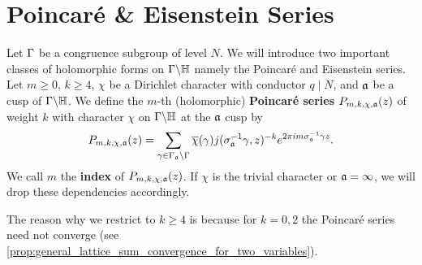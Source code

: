   \section{Poincar\'e \& Eisenstein Series}
    Let $\Gamma$ be a congruence subgroup of level $N$. We will introduce two important classes of holomorphic forms on $\Gamma\backslash\mathbb{H}$ namely the Poincar\'e and Eisenstein series. Let $m \ge 0$, $k \ge 4$, $\chi$ be a Dirichlet character with conductor $q \mid N$, and $\mathfrak{a}$ be a cusp of $\Gamma\backslash\mathbb{H}$. We define the $m$-th (holomorphic) \textbf{Poincar\'e series} $P_{m,k,\chi,\mathfrak{a}}(z)$ of weight $k$ with character $\chi$ on $\Gamma\backslash\mathbb{H}$ at the $\mathfrak{a}$ cusp by
    \[
      P_{m,k,\chi,\mathfrak{a}}(z) = \sum_{\gamma \in \Gamma_{\mathfrak{a}}\backslash\Gamma}\overline{\chi}(\gamma)j(\sigma_{\mathfrak{a}}^{-1}\gamma,z)^{-k}e^{2\pi im\sigma_{\mathfrak{a}}^{-1}\gamma z}.
    \]
    We call $m$ the \textbf{index} of $P_{m,k,\chi,\mathfrak{a}}(z)$. If $\chi$ is the trivial character or $\mathfrak{a} = \infty$, we will drop these dependencies accordingly. 

    \begin{remark}
      The reason why we restrict to $k \ge 4$ is because for $k = 0,2$ the Poincar\'e series need not converge (see \cref{prop:general_lattice_sum_convergence_for_two_variables}).
    \end{remark}

